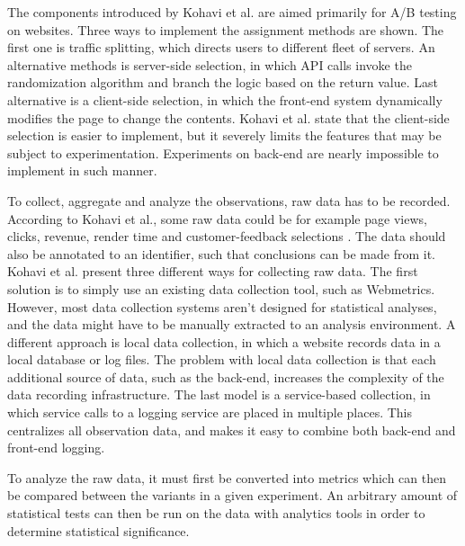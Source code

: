\documentclass[english]{tktltiki2}
\theoremstyle{definition}
\theoremstyle{remark}
\begin{document}
The components introduced by Kohavi et al. are aimed primarily for A/B testing on websites. Three ways to implement the assignment methods are shown. The first one is traffic splitting, which directs users to different fleet of servers. An alternative methods is server-side selection, in which API calls invoke the randomization algorithm and branch the logic based on the return value. Last alternative is a client-side selection, in which the front-end system dynamically modifies the page to change the contents. Kohavi et al. state that the client-side selection is easier to implement, but it severely limits the features that may be subject to experimentation. Experiments on back-end are nearly impossible to implement in such manner.

To collect, aggregate and analyze the observations, raw data has to be recorded. According to Kohavi et al., some raw data could be for example page views, clicks, revenue, render time and customer-feedback selections \cite{kohavi2007practical}. The data should also be annotated to an identifier, such that conclusions can be made from it. Kohavi et al. present three different ways for collecting raw data. The first solution is to simply use an existing data collection tool, such as Webmetrics. However, most data collection systems aren't designed for statistical analyses, and the data might have to be manually extracted to an analysis environment. A different approach is local data collection, in which a website records data in a local database or log files. The problem with local data collection is that each additional source of data, such as the back-end, increases the complexity of the data recording infrastructure. The last model is a service-based collection, in which service calls to a logging service are placed in multiple places. This centralizes all observation data, and makes it easy to combine both back-end and front-end logging.  

To analyze the raw data, it must first be converted into metrics which can then be compared between the variants in a given experiment. An arbitrary amount of statistical tests can then be run on the data with analytics tools in order to determine statistical significance. 
\end{document}
